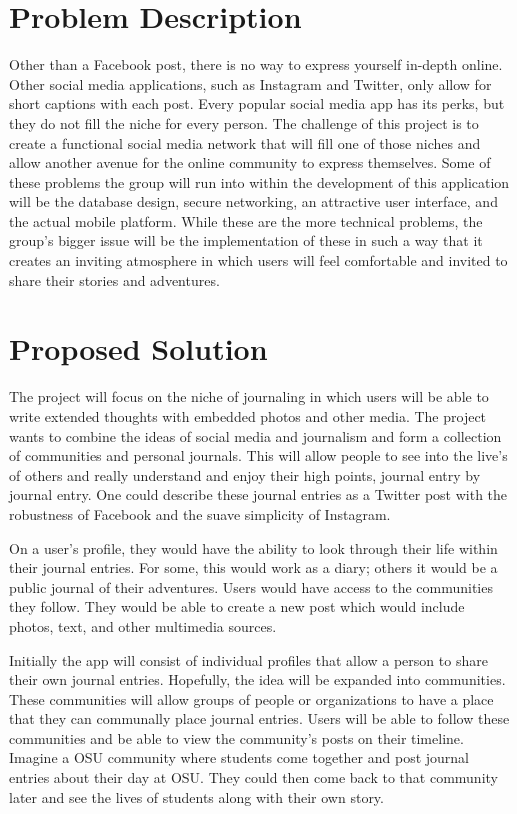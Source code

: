 \documentclass[letterpaper, 10, draftclsnofoot, onecolumn]{IEEEtran}
\begin{document}
\section*{Problem Description}\par
\hspace{4ex}Other than a Facebook post, there is no way to express
 yourself in-depth online. Other social media applications, such as Instagram and Twitter,
 only allow for short captions with each post. Every popular social media app has its perks, 
 but they do not fill the niche for every person. The challenge of this project is to create a
 functional social media network that will fill one of those niches and allow another 
 avenue for the online community to express themselves. Some of these problems the group will run into within the development of this 
application will be the database design, secure networking, an attractive user interface, and the actual mobile platform. While these are the more technical problems, the group's bigger issue will be the implementation of these in such a way that it creates an inviting atmosphere in which users will feel comfortable and invited to share their stories and adventures.

\section*{Proposed Solution}\par
\hspace{4ex} 
The project will focus on the niche of journaling in which users will be able to write extended thoughts with embedded photos and other media. The project wants to combine the ideas of social
media and journalism and form a collection of communities and personal journals. 
This will allow people to see into the live's of others and really understand and enjoy 
their high points, journal entry by journal entry. One could describe these journal entries
as a Twitter post with the robustness of Facebook and the suave simplicity of Instagram. 

On a user's profile, they would have the ability to look through their life within 
their journal entries. For some, this would work as a diary; others it would be a 
public journal of their adventures. Users would have access to the communities 
they follow. They would be able to create a new post which would include photos, 
text, and other multimedia sources. 

Initially the app will consist of individual profiles that allow a person to share 
their own journal entries. Hopefully, the idea will be expanded into communities.
These communities will allow groups of people or organizations to have 
a place that they can communally place journal entries. Users will be able to follow these 
communities and be able to view the community's posts on their timeline. Imagine a OSU community where
 students come together and post journal entries about their day at OSU. They could then come 
 back to that community later and see the lives of students along with their own story.   
 
\end{document}

